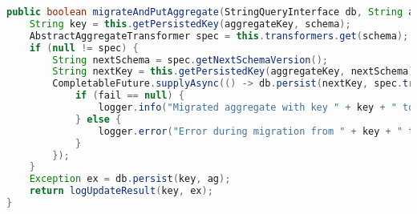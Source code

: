 \begin{lstlisting}[language=Java, caption={Metode for håndtering av PUT-spørring i Migrator.}]
public boolean migrateAndPutAggregate(StringQueryInterface db, String aggregateKey, String schema, String ag) {
    String key = this.getPersistedKey(aggregateKey, schema);
    AbstractAggregateTransformer spec = this.transformers.get(schema);
    if (null != spec) {
        String nextSchema = spec.getNextSchemaVersion();
        String nextKey = this.getPersistedKey(aggregateKey, nextSchema);
        CompletableFuture.supplyAsync(() -> db.persist(nextKey, spec.transformAggregate(ag))).thenAccept((fail) -> {
            if (fail == null) {
                logger.info("Migrated aggregate with key " + key + " to " + nextKey);
            } else {
                logger.error("Error during migration from " + key + " to " + nextKey + ":\n"+ fail.toString());
            }
        });
    }
    Exception ex = db.persist(key, ag);
    return logUpdateResult(key, ex);
}
\end{lstlisting}
